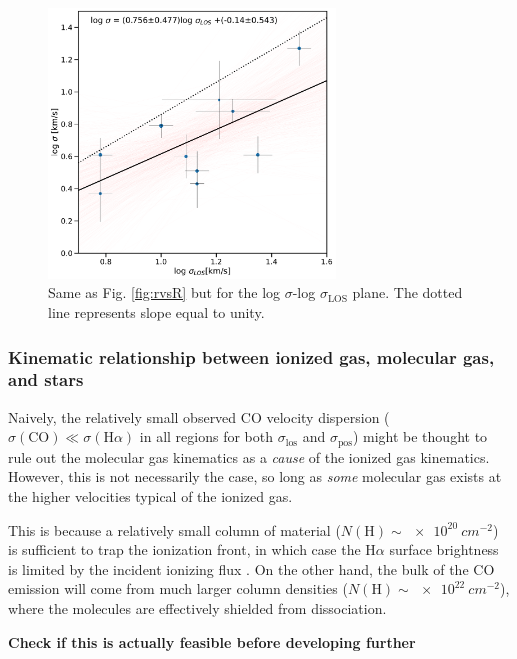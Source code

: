 \documentclass[fleqn,usenatbib, useAMS, a4paper]{mnras}
\newcommand\pos{\ensuremath{_{\mathrm{pos}}}}
\newcommand\los{\ensuremath{_{\mathrm{los}}}}
\newcommand\ha{\ensuremath{\text{H}\alpha}}
\newcommand*\chem[1]{\ensuremath{\mathrm{#1}}}
\begin{document}
\begin{figure}
\centering 
\includegraphics[width=3in]{Figures/svss.pdf}
\caption{Same as Fig. \ref{fig:rvsR} but for the log $\sigma$-log $\sigma_{\text{LOS}}$ plane. The dotted line represents slope equal to unity.}
\label{fig:svss}
\end{figure}

\subsubsection{Kinematic relationship between ionized gas, molecular gas, and stars}
\label{sec:kinem-rela-betw}

Naively, the relatively small observed CO velocity dispersion
(\(\sigma(\chem{CO}) \ll \sigma(\ha)\) in all regions
for both \(\sigma\los\) and \(\sigma\pos\))
might be thought to rule out the molecular gas kinematics
as a \emph{cause} of the ionized gas kinematics.
However, this is not necessarily the case, so long as \emph{some} molecular gas
exists at the higher velocities typical of the ionized gas.

This is because a relatively small column of material
(\(N(\chem{H}) \sim \SI{e20}{cm^{-2}}\))
is sufficient to trap the ionization front,
in which case the \ha{} surface brightness is limited by the
incident ionizing flux
\citetext{the Ferland mechanism,
  see section~5.1 of \citealt{Baldwin:1991a}
  and section~B.2.1 of \citealt{Ferland:2012a}
}.
On the other hand, the bulk of the CO emission will come from much larger
column densities (\(N(\chem{H}) \sim \SI{e22}{cm^{-2}}\)),
where the molecules are effectively shielded from dissociation.

\textbf{Check  if this is actually feasible before developing further}
\end{document}
